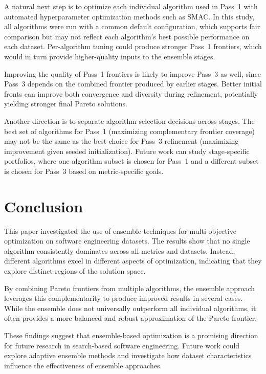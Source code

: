\documentclass[sigconf,authorversion,nonacm]{acmart}
\begin{document}
A natural next step is to optimize each individual algorithm used in 
Pass~1 with automated hyperparameter optimization methods such as SMAC. 
In this study, all algorithms were run with a common default configuration, 
which supports fair comparison but may not reflect each algorithm's best 
possible performance on each dataset. Per-algorithm tuning could produce 
stronger Pass~1 frontiers, which would in turn provide higher-quality 
inputs to the ensemble stages.

Improving the quality of Pass~1 frontiers is likely to improve Pass~3 as 
well, since Pass~3 depends on the combined frontier produced by earlier 
stages. Better initial fronts can improve both convergence and diversity 
during refinement, potentially yielding stronger final Pareto solutions.

Another direction is to separate algorithm selection decisions across stages. 
The best set of algorithms for Pass~1 (maximizing complementary frontier 
coverage) may not be the same as the best choice for Pass~3 refinement 
(maximizing improvement given seeded initialization). Future work can study 
stage-specific portfolios, where one algorithm subset is chosen for Pass~1 
and a different subset is chosen for Pass~3 based on metric-specific goals.

\section{Conclusion}

This paper investigated the use of ensemble techniques for multi-objective 
optimization on software engineering datasets. The results show that no 
single algorithm consistently dominates across all metrics and datasets. 
Instead, different algorithms excel in different aspects of optimization, 
indicating that they explore distinct regions of the solution space.

By combining Pareto frontiers from multiple algorithms, the ensemble 
approach leverages this complementarity to produce improved results in 
several cases. While the ensemble does not universally outperform all 
individual algorithms, it often provides a more balanced and robust 
approximation of the Pareto frontier.

These findings suggest that ensemble-based optimization is a promising 
direction for future research in search-based software engineering. 
Future work could explore adaptive ensemble methods and investigate how 
dataset characteristics influence the effectiveness of ensemble 
approaches.




\end{document}
